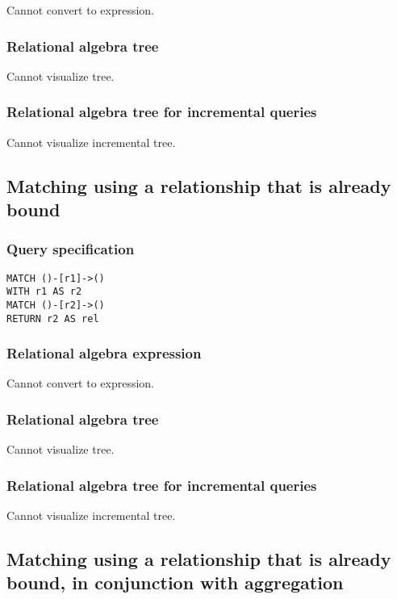 Cannot convert to expression.

\subsubsection*{Relational algebra tree}

Cannot visualize tree.

\subsubsection*{Relational algebra tree for incremental queries}

Cannot visualize incremental tree.

\subsection{Matching using a relationship that is already bound}

\subsubsection*{Query specification}

\begin{lstlisting}
MATCH ()-[r1]->()
WITH r1 AS r2
MATCH ()-[r2]->()
RETURN r2 AS rel
\end{lstlisting}

\subsubsection*{Relational algebra expression}

Cannot convert to expression.

\subsubsection*{Relational algebra tree}

Cannot visualize tree.

\subsubsection*{Relational algebra tree for incremental queries}

Cannot visualize incremental tree.

\subsection{Matching using a relationship that is already bound, in conjunction with aggregation}

